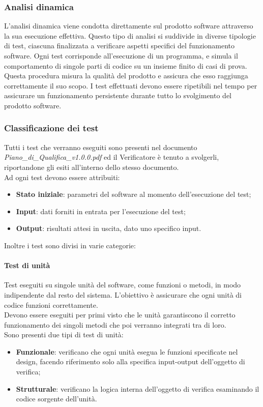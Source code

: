 \documentclass[10pt]{article}
\begin{document}
\begin{justify}
    \subsubsection{Analisi dinamica}
    L'analisi dinamica viene condotta direttamente sul prodotto software attraverso la sua esecuzione effettiva. Questo tipo di analisi si suddivide in diverse tipologie di test, ciascuna finalizzata a verificare aspetti specifici del funzionamento software. Ogni test corrisponde all'esecuzione di un programma, e simula il comportamento di singole parti di codice su un insieme finito di casi di prova.\\
    Questa procedura misura la qualità del prodotto e assicura che esso raggiunga correttamente il suo scopo. I test effettuati devono essere ripetibili nel tempo per assicurare un funzionamento persistente durante tutto lo svolgimento del prodotto software.
    
    \subsubsection{Classificazione dei test}
    Tutti i test che verranno eseguiti sono presenti nel documento \textit{Piano\_di\_Qualifica\_v1.0.0.pdf} ed il Verificatore è tenuto a svolgerli, riportandone gli esiti all'interno dello stesso documento.\\
    Ad ogni test devono essere attribuiti:
    \begin{itemize}
    \item \textbf{Stato iniziale}: parametri del software al momento dell'esecuzione del test;
    \item \textbf{Input}: dati forniti in entrata per l'esecuzione del test;
    \item \textbf{Output}: risultati attesi in uscita, dato uno specifico input.
    \end{itemize}
    Inoltre i test sono divisi in varie categorie:

    \paragraph{Test di unità}
    Test eseguiti su singole unità del software, come funzioni o metodi, in modo indipendente dal resto del sistema. L'obiettivo è assicurare che ogni unità di codice funzioni correttamente.\\
    Devono essere eseguiti per primi visto che le unità garantiscono il corretto funzionamento dei singoli metodi che poi verranno integrati tra di loro.\\
    Sono presenti due tipi di test di unità:
    \begin{itemize}
    \item \textbf{Funzionale}: verificano che ogni unità esegua le funzioni specificate nel design, facendo riferimento solo alla specifica input-output dell'oggetto di verifica;
    \item \textbf{Strutturale}: verificano la logica interna dell'oggetto di verifica esaminando il codice sorgente dell'unità.
    \end{itemize}


\end{justify}
\end{document}
